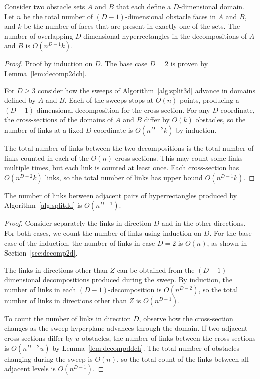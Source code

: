 \documentclass[english,gradu]{tktltiki2018}
\begin{document}
\begin{lem}\label{lem:decompddch}
Consider two obstacle sets $A$ and $B$ that each define a $D$-dimensional domain.
Let $n$ be the total number of $(D-1)$-dimensional obstacle faces in $A$ and $B$, and $k$ be the number of faces that are present in exactly one of the sets.
The number of overlapping $D$-dimensional hyperrectangles in the decompositions of $A$ and $B$ is $O(n^{D-1}k)$.
\end{lem}
\begin{proof}
Proof by induction on $D$.
The base case $D=2$ is proven by Lemma~\ref{lem:decomp2dch}.

For $D\ge 3$ consider how the sweeps of Algorithm~\ref{alg:split3d} advance in domains defined by $A$ and $B$.
Each of the sweeps stops at $O(n)$ points, producing a $(D-1)$-dimensional decomposition for the cross section.
For any $D$-coordinate, the cross-sections of the domains of $A$ and $B$ differ by $O(k)$ obstacles, so the number of links at a fixed $D$-coordinate is $O(n^{D-2}k)$ by induction.

The total number of links between the two decompositions is the total number of links counted in each of the $O(n)$ cross-sections.
This may count some links multiple times, but each link is counted at least once.
Each cross-section has $O(n^{D-2}k)$ links, so the total number of links has upper bound $O(n^{D-1}k)$.
\end{proof}

\begin{lem}\label{lem:splitddcount}The number of links between adjacent pairs of hyperrectangles produced by Algorithm~\ref{alg:splitdd} is $O(n^{D-1})$.\end{lem}
\begin{proof}
Consider separately the links in direction $D$ and in the other directions.
For both cases, we count the number of links using induction on $D$.
For the base case of the induction, the number of links in case $D=2$ is $O(n)$, as shown in Section~\ref{sec:decomp2d}.

The links in directions other than $Z$ can be obtained from the $(D-1)$-dimensional decompositions produced during the sweep.
By induction, the number of links in each $(D-1)$-decomposition is $O(n^{D-2})$, so the total number of links in directions other than $Z$ is $O(n^{D-1})$.

To count the number of links in direction $D$, observe how the cross-section changes as the sweep hyperplane advances through the domain.
If two adjacent cross sections differ by $u$ obstacles, the number of links between the cross-sections is $O(n^{D-2}u)$ by Lemma~\ref{lem:decompddch}.
The total number of obstacles changing during the sweep is $O(n)$, so the total count of the links between all adjacent levels is $O(n^{D-1})$.
\end{proof}
\end{document}
